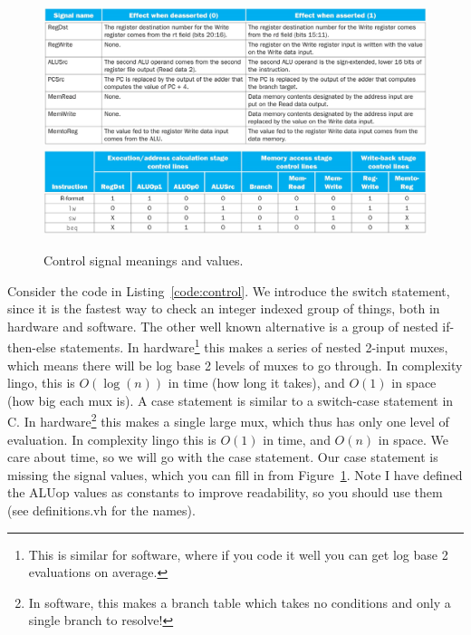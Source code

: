 \begin{figure}
\caption{Control signal meanings and values.}\label{fig:signals}
\begin{center}
\includegraphics[width=\textwidth]{../images/signal_meaning.png}\\
\includegraphics[width=\textwidth]{../images/control_lines.png}
\end{center}
\end{figure}

Consider the code in Listing~\ref{code:control}.  We introduce the switch statement, since it is the fastest way to check an integer indexed group of things, both in hardware and software.  The other well known alternative is a group of nested if-then-else statements.  In hardware\footnote{This is similar for software, where if you code it well you can get log base 2 evaluations on average.} this makes a series of nested 2-input muxes, which means there will be log base 2 levels of muxes to go through.  In complexity lingo, this is $O(\log(n))$ in time (how long it takes), and $O(1)$ in space (how big each mux is).  A case statement is similar to a switch-case statement in C.  In hardware\footnote{In software, this makes a branch table which takes no conditions and only a single branch to resolve!} this makes a single large mux, which thus has only one level of evaluation.  In complexity lingo this is $O(1)$ in time, and $O(n)$ in space.  We care about time, so we will go with the case statement.  Our case statement is missing the signal values, which you can fill in from Figure~\ref{fig:signals}.  Note I have defined the ALUop values as constants to improve readability, so you should use them (see definitions.vh for the names).

